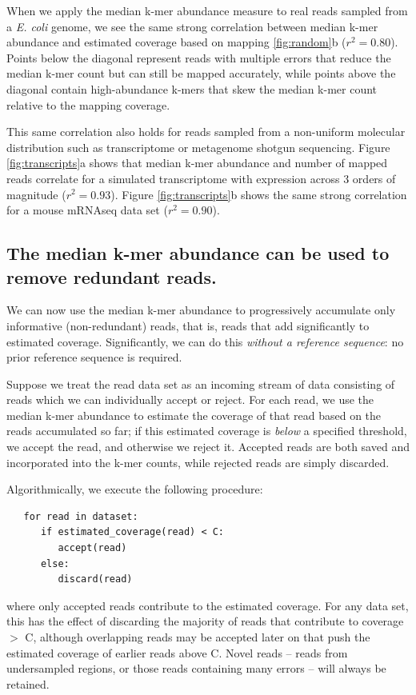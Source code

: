 \documentclass[10pt]{article}
\begin{document}
When we apply the median k-mer abundance measure to real reads sampled
from a {\em E. coli} genome, we see the same strong correlation
between median k-mer abundance and estimated coverage based on mapping
\ref{fig:random}b ($r^2=0.80$).  Points below the diagonal represent
reads with multiple errors that reduce the median k-mer count but can
still be mapped accurately, while points above the diagonal contain
high-abundance k-mers that skew the median k-mer count relative to
the mapping coverage.

This same correlation also holds for reads sampled from a non-uniform
molecular distribution such as transcriptome or metagenome shotgun
sequencing.  Figure \ref{fig:transcripts}a shows that median k-mer
abundance and number of mapped reads correlate for a simulated
transcriptome with expression across 3 orders of magnitude ($r^2 =
0.93$).  Figure \ref{fig:transcripts}b shows the same strong
correlation for a mouse mRNAseq data set ($r^2 = 0.90$).

\subsection*{The median k-mer abundance can be used to remove redundant reads.}

We can now use the median k-mer abundance to progressively accumulate
only informative (non-redundant) reads, that is, reads that add
significantly to estimated coverage.  Significantly, we can do this
{\em without a reference sequence}: no prior reference sequence is required.

Suppose we treat the read data set as an incoming stream of data
consisting of reads which we can individually accept or reject.  For
each read, we use the median k-mer abundance to estimate the coverage
of that read based on the reads accumulated so far; if this estimated
coverage is {\em below} a specified threshold, we accept the read, and
otherwise we reject it.  Accepted reads are both saved and
incorporated into the k-mer counts, while rejected reads are simply
discarded.

Algorithmically, we execute the following procedure:

\begin{verbatim}
   for read in dataset:
      if estimated_coverage(read) < C:
         accept(read)
      else:
         discard(read)
\end{verbatim}

where only accepted reads contribute to the estimated coverage.  For
any data set, this has the effect of discarding the majority of reads
that contribute to coverage $>$ C, although overlapping reads may be
accepted later on that push the estimated coverage of earlier reads
above C.  Novel reads -- reads from undersampled regions, or those
reads containing many errors -- will always be retained.
\end{document}
